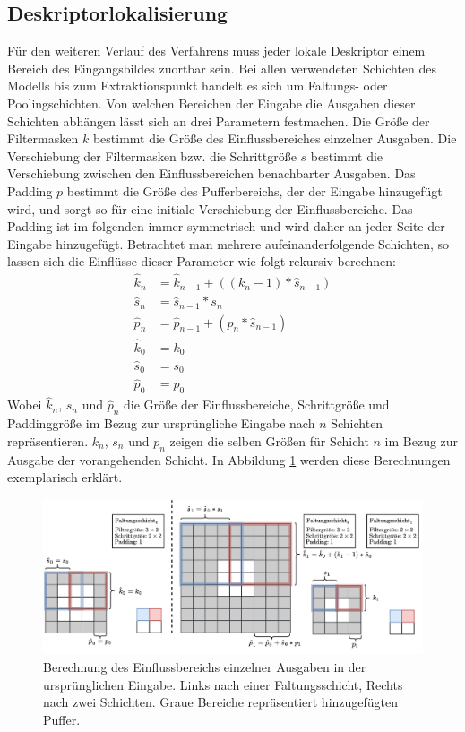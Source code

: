 \subsection{Deskriptorlokalisierung}
Für den weiteren Verlauf des Verfahrens muss jeder lokale Deskriptor einem Bereich des Eingangsbildes zuortbar sein. Bei allen verwendeten Schichten des Modells bis zum Extraktionspunkt handelt es sich um Faltungs- oder Poolingschichten. Von welchen Bereichen der Eingabe die Ausgaben dieser Schichten abhängen lässt sich an drei Parametern festmachen. Die Größe der Filtermasken $k$ bestimmt die Größe des Einflussbereiches einzelner Ausgaben. Die Verschiebung der Filtermasken bzw. die Schrittgröße $s$ bestimmt die Verschiebung zwischen den Einflussbereichen benachbarter Ausgaben. Das Padding $p$ bestimmt die Größe des Pufferbereichs, der der Eingabe hinzugefügt wird, und sorgt so für eine initiale Verschiebung der Einflussbereiche. Das Padding ist im folgenden immer symmetrisch und wird daher an jeder Seite der Eingabe hinzugefügt. Betrachtet man mehrere aufeinanderfolgende Schichten, so lassen sich die Einflüsse dieser Parameter wie folgt rekursiv berechnen:
\begin{align}
\hat{k}_n &= \hat{k}_{n-1} + ((k_n - 1) * \hat{s}_{n-1})
\\
\hat{s}_n &= \hat{s}_{n-1} * s_n
\\
\hat{p}_n &= \hat{p}_{n-1} + (p_n * \hat{s}_{n-1})
\\
\hat{k}_0 &= k_0
\\
\hat{s}_0 &= s_0
\\
\hat{p}_0 &= p_0
\end{align}
Wobei $\hat{k}_n$, $\hat{s}_n$ und $\hat{p}_n$ die Größe der Einflussbereiche, Schrittgröße und Paddinggröße im Bezug zur ursprüngliche Eingabe nach $n$ Schichten repräsentieren. $k_n$, $s_n$ und $p_n$ zeigen die selben Größen für Schicht $n$ im Bezug zur Ausgabe der vorangehenden Schicht. In Abbildung \ref{receptive_field} werden diese Berechnungen exemplarisch erklärt. 
\begin{figure}
\centering
\includegraphics[scale=0.51]{rf.pdf}
\caption{Berechnung des Einflussbereichs einzelner Ausgaben in der ursprünglichen Eingabe. Links nach einer Faltungsschicht, Rechts nach zwei Schichten. Graue Bereiche repräsentiert hinzugefügten Puffer.}
\label{receptive_field}
\end{figure}
